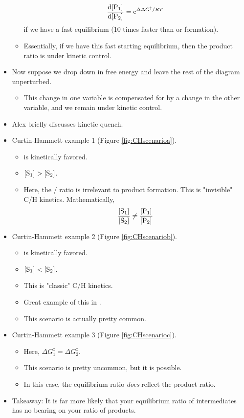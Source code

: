\documentclass[../notes.tex]{subfiles}
\begin{document}
\begin{itemize}
\begin{itemize}
\begin{equation*}
            \dv{\cnc{P1}}{\cnc{P2}} = \e[\Delta\Delta G^\ddagger/RT]
        \end{equation*}
        if we have a fast equilibrium  (10 times faster than  or  formation).
        \item Essentially, if we have this fast starting equilibrium, then the product ratio is under kinetic control.
    \end{itemize}
    \item Now suppose we drop  down in free energy and leave the rest of the diagram unperturbed.
    \begin{itemize}
        \item This change in one variable is compensated for by a change in the other variable, and we remain under kinetic control.
    \end{itemize}
    \item Alex briefly discusses kinetic quench.
    \item Curtin-Hammett example 1 (Figure \ref{fig:CHscenarioa}).
    \begin{itemize}
        \item {} is kinetically favored.
        \item $\cnc{S1}>\cnc{S2}$.
        \item Here, the / ratio is irrelevant to product formation. This is "invisible" C/H kinetics. Mathematically,
        \begin{equation*}
            \frac{\cnc{S1}}{\cnc{S2}} \neq \frac{\cnc{P1}}{\cnc{P2}}
        \end{equation*}
    \end{itemize}
    \item Curtin-Hammett example 2 (Figure \ref{fig:CHscenariob}).
    \begin{itemize}
        \item {} is kinetically favored.
        \item $\cnc{S1}<\cnc{S2}$.
        \item This is "classic" C/H kinetics.
        \item Great example of this in \textcite{bib:CHexample}.
        \item This scenario is actually pretty common.
    \end{itemize}
    \item Curtin-Hammett example 3 (Figure \ref{fig:CHscenarioc}).
    \begin{itemize}
        \item Here, $\Delta G^\ddagger_1=\Delta G^\ddagger_2$.
        \item This scenario is pretty uncommon, but it is possible.
        \item In this case, the equilibrium ratio \emph{does} reflect the product ratio.
    \end{itemize}
    \item Takeaway: It is far more likely that your equilibrium ratio of intermediates has no bearing on your ratio of products.
\end{itemize}
\end{document}
